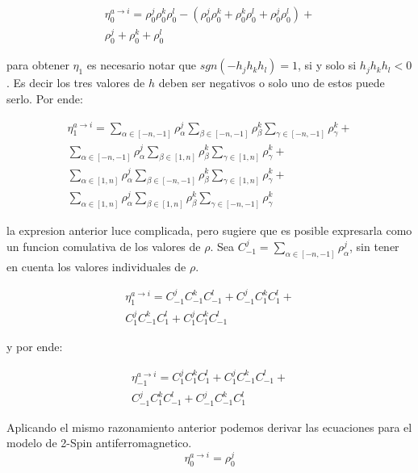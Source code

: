 \documentclass[11pt]{amsart}
\theoremstyle{definition} \newtheorem{defi}{Definition}
\begin{document}
	\begin{multline}
	\eta_0^{a \to i} = 
	\rho_0^j \rho_0^k \rho_0^l - (\rho_0^j \rho_0^k + \rho_0^k \rho_0^l + \rho_0^j 	\rho_0^l) +
	\\
	\rho_0^j + \rho_0^k + \rho_0^l
	\end{multline} 

	para obtener $\eta_1$ es necesario notar que $sgn(-h_j h_k h_l)=1$, si y 
	solo si $h_j h_k h_l < 0$. Es decir los tres valores de $h$ deben ser negativos o 
	solo uno de estos puede serlo. Por ende:

	\begin{multline}
	\eta_1^{a \to i} = 
	\sum_{\alpha \in [-n, -1]} \rho_{\alpha}^j \sum_{\beta \in [-n, -1]} \rho_{\beta}^k \sum_{\gamma 	\in [-n, -1]} \rho_{\gamma}^k +
	\\
	\sum_{\alpha \in [-n, -1]} \rho_{\alpha}^j \sum_{\beta \in [1, n]} \rho_{\beta}^k \sum_{\gamma \in [1, n]} \rho_{\gamma}^k +
	\\
	\sum_{\alpha \in [1, n]} \rho_{\alpha}^j \sum_{\beta \in [-n, -1]} \rho_{\beta}^k \sum_{\gamma \in 	[1, n]} \rho_{\gamma}^k +
	\\
	\sum_{\alpha \in [1, n]} \rho_{\alpha}^j \sum_{\beta \in [1, n]} \rho_{\beta}^k \sum_{\gamma \in [-	n, -1]} \rho_{\gamma}^k
	\end{multline} 

	la expresion anterior luce complicada, pero sugiere que es posible expresarla 
	como un funcion comulativa de los valores de $\rho$. 
	Sea $C_{-1}^j = \sum_{\alpha \in [-n, -1]} \rho_{\alpha}^j$, sin tener en cuenta 
	los valores individuales de $\rho$.

	\begin{multline}
	\eta_1^{a \to i} = 
	C_{-1}^j C_{-1}^k C_{-1}^l +
	C_{-1}^j C_{1}^k C_{1}^l   +
	\\
	C_{1}^j C_{-1}^k C_{1}^l +
	C_{1}^j C_{1}^k C_{-1}^l
	\end{multline} 

	y por ende: 
	
	\begin{multline}
	\eta_{-1}^{a \to i} = 
	C_{1}^j C_{1}^k C_{1}^l +
	C_{1}^j C_{-1}^k C_{-1}^l   +
	\\
	C_{-1}^j C_{1}^k C_{-1}^l +
	C_{-1}^j C_{-1}^k C_{1}^l
	\end{multline}

	Aplicando el mismo razonamiento anterior podemos derivar las ecuaciones para el 
	modelo de 2-Spin antiferromagnetico.
	\begin{equation}
	\eta_0^{a \to i} = \rho_0^j
	\end{equation}
\end{document}
